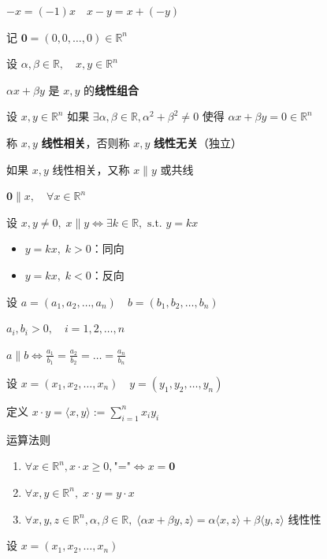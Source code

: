 \(-x=(-1)x \quad x-y=x+(-y)\)

记 \(\mathbf{0}=(0,0,\dots, 0) \in \mathbb{R}^n\)

设 \(\alpha ,\beta \in \mathbb{R}, \quad x, y \in \mathbb{R}^n\)

\(\alpha x+ \beta y\) 是 \(x, y\) 的\textbf{线性组合}

设 \(x, y \in \mathbb{R}^n\) 如果
\(\exists \alpha, \beta \in \mathbb{R}, \alpha^2+\beta^{2}\neq 0\) 使得
\(\alpha x+\beta y = 0 \in \mathbb{R}^n\)

称 \(x, y\) \textbf{线性相关}，否则称 \(x, y\) \textbf{线性无关}（独立）

如果 \(x, y\) 线性相关，又称 \(x \parallel y\) 或共线

\(\mathbf{0} \parallel x, \quad \forall x \in \mathbb{R}^n\)

设
\(x, y \neq 0, \; x \parallel y \Longleftrightarrow \exists k \in \mathbb{R}, \text{ s.t. } y=kx\)

\begin{itemize}
\tightlist
\item
  \(y=kx, \; k>0\)：同向
\item
  \(y=kx,\; k<0\)：反向
\end{itemize}

设 \(a=(a_{1},a_{2},\dots,a_{n}) \quad b=(b_{1}, b_{2},\dots,b_{n})\)

\(a_{i},b_{i}>0, \quad i=1,2,\dots,n\)

\(a\parallel b \Longleftrightarrow \frac{a_{1}}{b_{1}}= \frac{a_{2}}{b_{2}} =\dots=\frac{a_{n}}{b_{n}}\)

设 \(x=(x_{1},x_{2}, \dots,x_{n}) \quad y=(y_{1},y_{2}, \dots, y_{n})\)

定义 \(x \cdot y = \langle x, y \rangle := \sum_{i=1}^n x_{i} y_{i}\)

运算法则

\begin{enumerate}
\def\labelenumi{\arabic{enumi}.}
\tightlist
\item
  \(\forall  x \in \mathbb{R}^n, x\cdot x\geq 0, \text{"="} \Leftrightarrow x=\mathbf{0}\)
\item
  \(\forall x, y \in \mathbb{R}^n,\; x \cdot y =y\cdot x\)
\item
  \(\forall x, y, z \in \mathbb{R}^n, \alpha, \beta \in \mathbb{R},\; \langle \alpha x +\beta y , z\rangle=\alpha \langle x, z\rangle + \beta \langle y, z\rangle\)
  线性性
\end{enumerate}

设 \(x=(x_{1},x_{2},\dots,x_{n})\)

